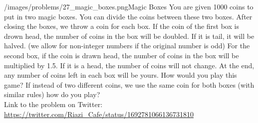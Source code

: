 \begin{problem}{/images/problems/27_magic_boxes.png}{Magic Boxes}
	You are given 1000 coins to put in two magic boxes. You can divide the coins between these two boxes. After closing the boxes, we throw a coin for each box.
If the coin of the first box is drown head, the number of coins in the box will be doubled. If it is tail, it will be halved. (we allow for non-integer numbers if the original number is odd)
For the second box, if the coin is drawn head, the number of coins in the box will be multiplied by 1.5. If it is a head, the number of coins will  not change.
At the end, any number of coins left in each box will be yours. How would  you play this game?
If instead of two different coins, we use the same coin for both boxes (with similar rules) how do you play?\\[0.2cm]

Link to the problem on Twitter:  \url{https://twitter.com/Riazi_Cafe/status/1692781066136731810}
\end{problem}
